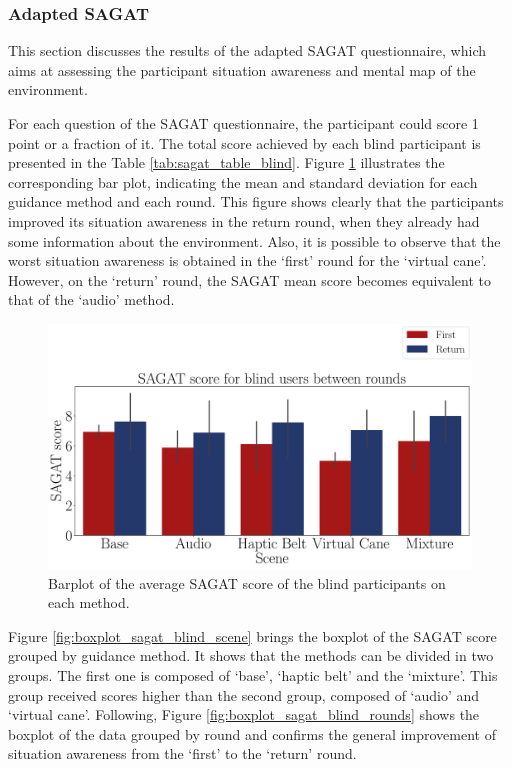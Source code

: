 \subsubsection{Adapted SAGAT}
\label{subsubsec:results_adapted_sagat_1}

This section discusses the results of the adapted SAGAT questionnaire, which aims at assessing the participant situation awareness and mental map of the environment. 

For each question of the SAGAT questionnaire, the participant could score 1 point or a fraction of it. The total score achieved by each blind participant is presented in the Table \ref{tab:sagat_table_blind}. Figure  \ref{fig:barplot_sagat_avg_5_scene_blind} illustrates the corresponding bar plot, indicating the mean and standard deviation for each guidance method and each round. This figure shows clearly that the participants improved its situation awareness in the return round, when they already had some information about the environment. Also, it is possible to observe that the worst situation awareness is obtained in the ‘first’ round for the ‘virtual cane’. However, on the ‘return’ round, the SAGAT mean score becomes equivalent to that of the ‘audio’ method.



\begin{figure}[!htb]
    \centering
    \includegraphics[width = 0.8\linewidth]{Resultados/Sagat/Figuras/pdf/barplot_sagat_avg_5_scene_blind.pdf}
    \caption{Barplot of the average SAGAT score of the blind participants on each method.}
    \label{fig:barplot_sagat_avg_5_scene_blind}
\end{figure}

Figure \ref{fig:boxplot_sagat_blind_scene} brings the boxplot of the SAGAT score grouped by guidance method. It shows that the methods can be divided in two groups. The first one is composed of ‘base’, ‘haptic belt’ and the ‘mixture’. This group received scores higher than the second group, composed of ‘audio’ and ‘virtual cane’. Following, Figure \ref{fig:boxplot_sagat_blind_rounds} shows the boxplot of the data grouped by round and confirms the general improvement of situation awareness from the ‘first’ to the ‘return’ round. 

